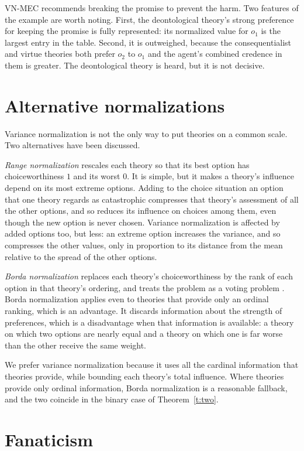 \documentclass{situationist-preprint}
\begin{document}
VN-MEC recommends breaking the promise to prevent the harm. Two features of the example are worth noting. First, the deontological theory's strong preference for keeping the promise is fully represented: its normalized value for $o_1$ is the largest entry in the table. Second, it is outweighed, because the consequentialist and virtue theories both prefer $o_2$ to $o_1$ and the agent's combined credence in them is greater. The deontological theory is heard, but it is not decisive.

\section{Alternative normalizations}

Variance normalization is not the only way to put theories on a common scale. Two alternatives have been discussed.

\emph{Range normalization} rescales each theory so that its best option has choiceworthiness $1$ and its worst $0$. It is simple, but it makes a theory's influence depend on its most extreme options. Adding to the choice situation an option that one theory regards as catastrophic compresses that theory's assessment of all the other options, and so reduces its influence on choices among them, even though the new option is never chosen. Variance normalization is affected by added options too, but less: an extreme option increases the variance, and so compresses the other values, only in proportion to its distance from the mean relative to the spread of the other options.

\emph{Borda normalization} replaces each theory's choiceworthiness by the rank of each option in that theory's ordering, and treats the problem as a voting problem \citep{MacAskill2016}. Borda normalization applies even to theories that provide only an ordinal ranking, which is an advantage. It discards information about the strength of preferences, which is a disadvantage when that information is available: a theory on which two options are nearly equal and a theory on which one is far worse than the other receive the same weight.

We prefer variance normalization because it uses all the cardinal information that theories provide, while bounding each theory's total influence. Where theories provide only ordinal information, Borda normalization is a reasonable fallback, and the two coincide in the binary case of Theorem~\ref{t:two}.

\section{Fanaticism}
\end{document}
